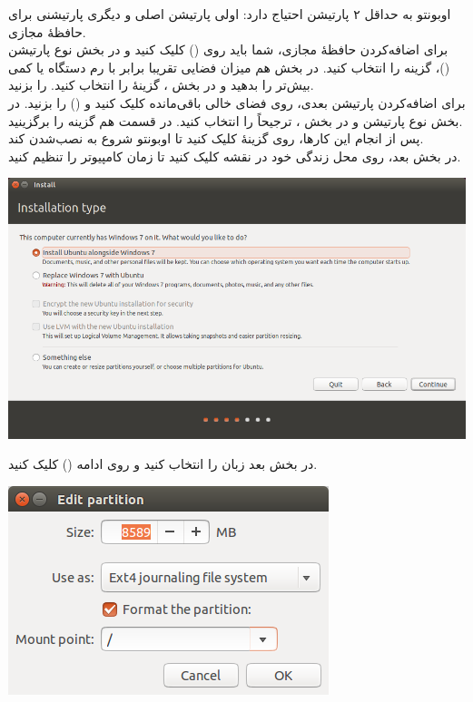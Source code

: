 اوبونتو به حداقل ۲ پارتیشن احتیاج دارد: اولی پارتیشن اصلی و دیگری پارتیشنی برای حافظهٔ مجازی.\\
برای اضافه‌کردن حافظهٔ مجازی، شما باید روی \lr{+} () کلیک کنید و در بخش نوع پارتیشن ()، گزینه  را انتخاب کنید. در بخش  هم میزان فضایی تقریبا برابر با رم دستگاه یا کمی بیش‌تر را بدهید و در بخش ، گزینهٔ  را انتخاب کنید.  را بزنید.\\
برای اضافه‌کردن پارتیشن بعدی، روی فضای خالی باقی‌مانده کلیک کنید و \lr{+} () را بزنید. در بخش نوع پارتیشن  و در بخش ، ترجیحاً  را انتخاب کنید. در قسمت  هم گزینه \lr{/} را برگزینید.\\
پس از انجام این کارها، روی گزینهٔ  کلیک کنید تا اوبونتو شروع به نصب‌شدن کند.\\
در بخش بعد، روی محل زندگی خود در نقشه کلیک کنید تا زمان کامپیوتر را تنظیم کنید.\\
\begin{center}
\includegraphics[scale=0.41]{pics/6.png}\\
\end{center}
در بخش بعد زبان  را انتخاب کنید و روی ادامه () کلیک کنید.\\
\begin{center}
\includegraphics[scale=0.41]{pics/7.png}\\
\end{center}
